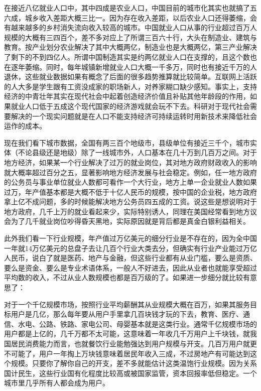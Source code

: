 \documentclass[]{tufte-book}
\begin{document}
在接近八亿就业人口中，其中四成是农业人口，中国目前的城市化其实也就搞了五六成，城乡收入差距大概三比一。因为存在收入差距，以后农业人口还得萎缩，会有越来越多的乡村消失流向收入较高的城市。中国就业人口从事的行业超过百万人规模的大概有三四百个，差不多对应上了所谓三百六十行，大头在制造业、建筑与教育。按产业划分农业解决了其中大概两亿，制造业也是大概两亿，第三产业解决了剩下的不到四亿人。所谓中国制造其实是约两亿就业人口在支撑的，且这个数也在逐年萎缩。同时，每年城镇新增就业人口大概一千多万，同时也有接近千万的人退休，这些就业数据如果有概念了后面的很多趋势推算就比较简单。互联网上活跃的人大多是学生跟有工资没成家的职场新人，对养家糊口缺少感知。事实上，支持经济的中青壮年其实在现代社会中起着创造经济价值且补贴其他年龄段的作用，如果就业人口低于五成这个现代国家的经济游戏就会玩不下去。科研对于现代社会需要解决的一个现实问题就是在人口不能支持经济可持续运转时用新技术来降低社会运作的成本。

现在我们看下城市数据，全国有两三百个地级市，县级单位有接近三千个，城市实体（不论县级还是地级）除了一线城市外，人口基本在几十万到几百万之间。对于地方经济，如果某一个行业解决了过万的就业岗位，其对地方政府财政收入的影响就大概率超过百分之五，显著影响地方经济发展与社会稳定。例如，任一地方政府的公务员与事业单位就业人数都可看作一个大行业，地方上单一企业就业人数如果过万，年产值基本都是大概不低于十亿人民币的规模，按中国的企业税，地方政府拿上亿不成问题，多的时候能解决地方公务员四五成的工资。说这些是想说明对于地方政府，几千上万的就业看起来少，实际特别诱人，同理在美国经常看到地方议会为了几千就业岗位吵得昏天黑地，实际原因就是背后都是真金白银利益相关。

此外我们看一下行业规模，年产值过万亿美元的细分行业是不存在的，因为全中国一年就14万亿美元的总盘子去让几百个行业大类去分，但确实有行业产业能过万亿人民币，说白了就是医药、地产与金融，但这些行业都有从业门槛，要么是资质、要么是资金、要么是专业术语体系，一般人不好进去，因此从业者也就能享受超过平均数的收入，不过从业人数规模也都是百万级的了。如果进一步细分就比较有意思了：

对于一个千亿规模市场，按照行业平均薪酬其从业规模大概在百万，如果其服务目标用户是几亿，那么每年要从用户手里拿几百块钱才玩的下去，教育、医疗、通信、水电、公路、铁路、家电公司、母婴基本就是这类行业。通常千亿规模市场的用户都是上亿的，几千万都不太可能，这意味着一年收几千万用户上千块钱，就我国居民消费能力而言，也就餐饮行业能勉强达到用户规模与开支。几百万用户就更不可能了，用户一年掏上万块钱意味着居民年收入三成，不过房地产有可能达到这个规模。只要你了解你自己的开支，差不多就能估计这类温饱行业规模。因为关系国计民生，这些行业国有化程度比较高或被国家监管，资本回报率低但稳定。一个城市里几乎所有人都会成为用户。
\end{document}
